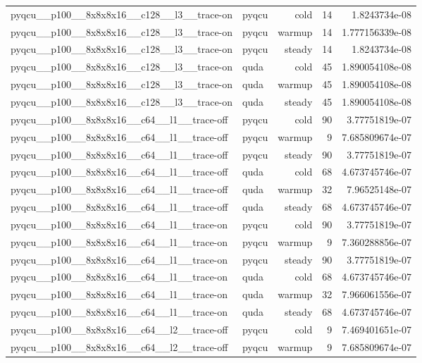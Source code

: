 \begin{table}[htbp]
\begin{tabular}{@{}llrrr@{}}
pyqcu\_\_p100\_\_8x8x8x16\_\_c128\_\_l3\_\_trace-on & pyqcu & cold & 14 & 1.8243734e-08 \\
pyqcu\_\_p100\_\_8x8x8x16\_\_c128\_\_l3\_\_trace-on & pyqcu & warmup & 14 & 1.777156339e-08 \\
pyqcu\_\_p100\_\_8x8x8x16\_\_c128\_\_l3\_\_trace-on & pyqcu & steady & 14 & 1.8243734e-08 \\
pyqcu\_\_p100\_\_8x8x8x16\_\_c128\_\_l3\_\_trace-on & quda & cold & 45 & 1.890054108e-08 \\
pyqcu\_\_p100\_\_8x8x8x16\_\_c128\_\_l3\_\_trace-on & quda & warmup & 45 & 1.890054108e-08 \\
pyqcu\_\_p100\_\_8x8x8x16\_\_c128\_\_l3\_\_trace-on & quda & steady & 45 & 1.890054108e-08 \\
pyqcu\_\_p100\_\_8x8x8x16\_\_c64\_\_l1\_\_trace-off & pyqcu & cold & 90 & 3.77751819e-07 \\
pyqcu\_\_p100\_\_8x8x8x16\_\_c64\_\_l1\_\_trace-off & pyqcu & warmup & 9 & 7.685809674e-07 \\
pyqcu\_\_p100\_\_8x8x8x16\_\_c64\_\_l1\_\_trace-off & pyqcu & steady & 90 & 3.77751819e-07 \\
pyqcu\_\_p100\_\_8x8x8x16\_\_c64\_\_l1\_\_trace-off & quda & cold & 68 & 4.673745746e-07 \\
pyqcu\_\_p100\_\_8x8x8x16\_\_c64\_\_l1\_\_trace-off & quda & warmup & 32 & 7.96525148e-07 \\
pyqcu\_\_p100\_\_8x8x8x16\_\_c64\_\_l1\_\_trace-off & quda & steady & 68 & 4.673745746e-07 \\
pyqcu\_\_p100\_\_8x8x8x16\_\_c64\_\_l1\_\_trace-on & pyqcu & cold & 90 & 3.77751819e-07 \\
pyqcu\_\_p100\_\_8x8x8x16\_\_c64\_\_l1\_\_trace-on & pyqcu & warmup & 9 & 7.360288856e-07 \\
pyqcu\_\_p100\_\_8x8x8x16\_\_c64\_\_l1\_\_trace-on & pyqcu & steady & 90 & 3.77751819e-07 \\
pyqcu\_\_p100\_\_8x8x8x16\_\_c64\_\_l1\_\_trace-on & quda & cold & 68 & 4.673745746e-07 \\
pyqcu\_\_p100\_\_8x8x8x16\_\_c64\_\_l1\_\_trace-on & quda & warmup & 32 & 7.966061556e-07 \\
pyqcu\_\_p100\_\_8x8x8x16\_\_c64\_\_l1\_\_trace-on & quda & steady & 68 & 4.673745746e-07 \\
pyqcu\_\_p100\_\_8x8x8x16\_\_c64\_\_l2\_\_trace-off & pyqcu & cold & 9 & 7.469401651e-07 \\
pyqcu\_\_p100\_\_8x8x8x16\_\_c64\_\_l2\_\_trace-off & pyqcu & warmup & 9 & 7.685809674e-07 \\

\end{tabular}
\end{table}
